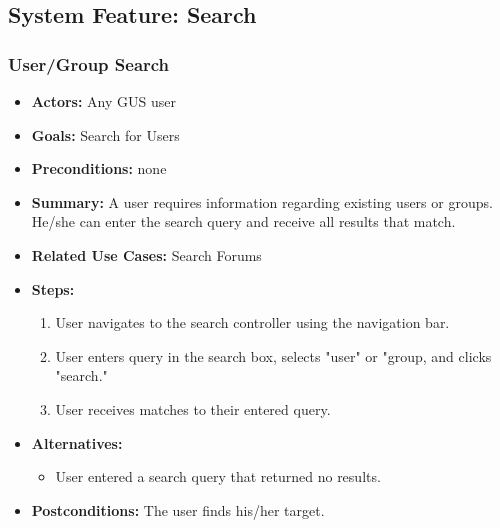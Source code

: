 \subsection{System Feature: Search}
	\subsubsection{User/Group Search}
                        \begin{itemize}
                                \item{\textbf{Actors:} Any GUS user}
                                \item{\textbf{Goals:} Search for Users}
                                \item{\textbf{Preconditions:} none}
                                \item{\textbf{Summary:} A user requires information regarding existing users or groups. He/she can enter the search query and receive all results that match.} 
                                \item{\textbf{Related Use Cases:} Search Forums}
                                \item{\textbf{Steps:}}
                                \begin{enumerate}
									\item User navigates to the search controller using the navigation bar.
									\item User enters query in the search box, selects "user" or "group, and clicks "search."										
									\item User receives matches to their entered query.
								\end{enumerate}
                                \item{\textbf{Alternatives:}}
									\begin{itemize}
										\item User entered a search query that returned no results.
									\end{itemize}
                                \item{\textbf{Postconditions:} The user finds his/her target.}
                        \end{itemize}